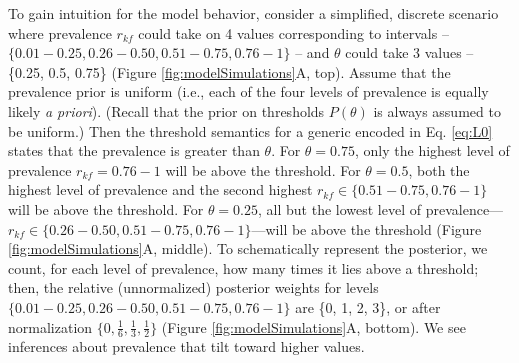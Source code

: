 \documentclass[floatsintext,doc]{apa6}
\newcommand{\denote}[1]{\mbox{ $[\![ #1 ]\!]$}}
\newcommand*\diff{\mathop{}\!\mathrm{d}}
\newcommand{\mht}[1]{{\textcolor{Blue}{[mht: #1]}}}
\begin{document}
To gain intuition for the model behavior, consider a simplified, discrete scenario where prevalence $r_{kf}$ could take on 4 values corresponding to intervals -- $\{0.01-0.25, 0.26 - 0.50, 0.51 - 0.75, 0.76 - 1\}$ -- and $\theta$ could take 3 values -- \{0.25, 0.5, 0.75\} (Figure \ref{fig:modelSimulations}A, top). Assume that the prevalence prior is uniform (i.e., each of the four levels of prevalence is equally likely \emph{a priori}). (Recall that the prior on thresholds $P(\theta)$ is always assumed to be uniform.)
Then the threshold semantics for a generic encoded in Eq. \ref{eq:L0} states that the prevalence is greater than $\theta$.
For $\theta = 0.75$, only the highest level of prevalence $r_{kf} = 0.76 - 1$ will be above the threshold.  
For $\theta = 0.5$, both the highest level of prevalence and the second highest $r_{kf} \in \{0.51 - 0.75, 0.76 - 1\}$ will be above the threshold.  
For $\theta = 0.25$, all but the lowest level of prevalence---$r_{kf} \in \{0.26 - 0.50, 0.51 - 0.75, 0.76 - 1\}$---will be above the threshold (Figure \ref{fig:modelSimulations}A, middle).  
To schematically represent the posterior, we count, for each level of prevalence, how many times it lies above a threshold; then, the relative (unnormalized) posterior weights for levels $\{0.01-0.25, 0.26 - 0.50, 0.51 - 0.75, 0.76 - 1 \}$ are \{0, 1, 2, 3\}, or after normalization  $\{0, \frac{1}{6}, \frac{1}{3}, \frac{1}{2}\}$ (Figure \ref{fig:modelSimulations}A, bottom).
We see inferences about prevalence that tilt toward higher values.





%
%
\end{document}

